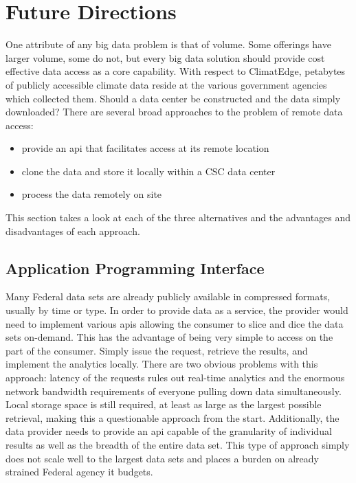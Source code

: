 \section{Future Directions}
One attribute of any big data problem is that of volume. Some offerings have larger volume, some do not, but every big data solution should provide cost effective data access as a core capability. With respect to ClimatEdge, petabytes of publicly accessible climate data reside at the various government agencies which collected them. Should a data center be constructed and the data simply downloaded? There are several broad approaches to the problem of remote data access:
\begin{itemize}
    \item provide an \gls{api} that facilitates access at its remote location
    \item clone the data and store it locally within a \textsc{CSC} data center
    \item process the data remotely on site
\end{itemize}
This section takes a look at each of the three alternatives and the advantages and disadvantages of each approach.
\subsection{Application Programming Interface}
Many Federal data sets are already publicly available in compressed formats, usually by time or type. In order to provide data as a service, the provider would need to implement various \gls{api}s allowing the consumer to slice and dice the data sets on-demand. This has the advantage of being very simple to  access on the part of the consumer. Simply issue the request, retrieve the results, and implement the analytics locally. There are two obvious problems with this approach: latency of the requests rules out real-time analytics and the enormous network bandwidth requirements of everyone pulling down data simultaneously. Local storage space is still required, at least as large as the largest possible retrieval, making this a questionable approach from the start. Additionally, the data provider needs to provide an \gls{api} capable of the granularity of individual results as well as the breadth of the entire data set. This type of approach simply does not scale well to the largest data sets and places a burden on already strained Federal agency \gls{it} budgets.
